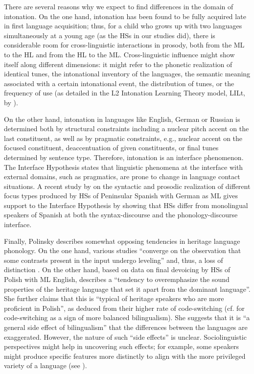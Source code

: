 \documentclass[output=paper,colorlinks,citecolor=brown]{langscibook}
\begin{document}
There are several reasons why we expect to find differences in the domain of intonation. On the one hand, intonation has been found to be fully acquired late in first language acquisition; thus, for a child who grows up with two languages simultaneously at a young age (as the HSs in our studies did), there is considerable room for cross-linguistic interactions in prosody, both from the ML to the HL and from the HL to the ML. Cross-linguistic influence might show itself along different dimensions: it might refer to the phonetic realization of identical tunes, the intonational inventory of the languages, the semantic meaning associated with a certain intonational event, the distribution of tunes, or the frequency of use (as detailed in the L2 Intonation Learning Theory model, LILt, by \cite{Mennen_2015}).\largerpage

On the other hand, intonation in languages like English, German or Russian is determined both by structural constraints including a nuclear pitch accent on the last constituent, as well as by pragmatic constraints, e.g., nuclear accent on the focused constituent, deaccentuation of given constituents, or final tunes determined by sentence type. Therefore, intonation is an interface phenomenon. The Interface Hypothesis \citep{Sorace_2011} states that linguistic phenomena at the interface with external domains, such as pragmatics, are prone to change in language contact situations. A recent study by \citet{Feldhausen_Vanrell_forth} on the syntactic and prosodic realization of different focus types produced by HSs of Peninsular Spanish with German as ML gives support to the Interface Hypothesis by showing that HSs differ from monolingual speakers of Spanish at both the syntax-discourse and the phonology-discourse interface.

Finally, Polinsky describes somewhat opposing tendencies in heritage language phonology. On the one hand, various studies “converge on the observation that some contrasts present in the input undergo leveling” and, thus, a loss of distinction 
\citep[125]{Polinsky_2018}. On the other hand, based on data on final devoicing by HSs of Polish with ML English, \citet[134]{Polinsky_2018} describes a “tendency to overemphasize the sound properties of the heritage language that set it apart from the dominant language”. She further claims that this is “typical of heritage speakers who are more proficient in Polish”, as deduced from their higher rate of code-switching (cf. \cite{Poplack_1980} for code-switching as a sign of more balanced bilingualism). She suggests that it is “a general side effect of bilingualism” \citep[136]{Polinsky_2018} that the differences between the languages are exaggerated. However, the nature of such “side effects” is unclear. Sociolinguistic perspectives might help in uncovering such effects; for example, some speakers might produce specific features more distinctly to align with the more privileged variety of a language (see \cite{chapters/11}).
\end{document}

